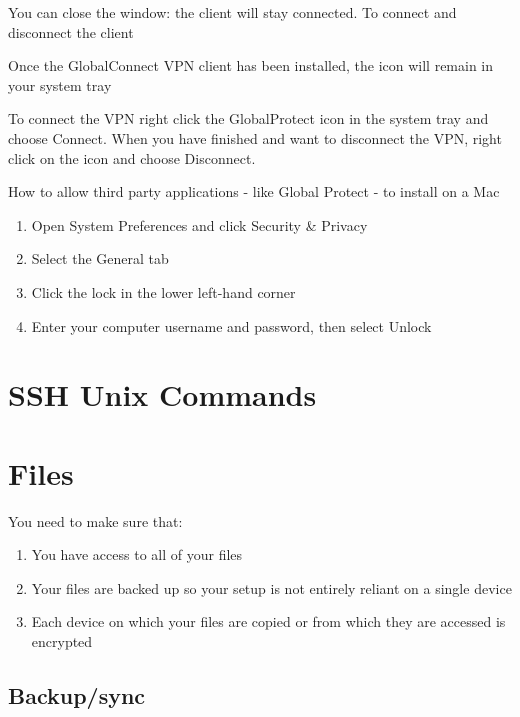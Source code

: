 \documentclass[
]{book}
\providecommand{\tightlist}{%
  \setlength{\itemsep}{0pt}\setlength{\parskip}{0pt}}
\begin{document}
You can close the window: the client will stay connected.
To connect and disconnect the client

Once the GlobalConnect VPN client has been installed, the icon will remain in your system tray

To connect the VPN right click the GlobalProtect icon in the system tray and choose Connect.
When you have finished and want to disconnect the VPN, right click on the icon and choose Disconnect.

How to allow third party applications - like Global Protect - to install on a Mac

\begin{enumerate}
\def\labelenumi{\arabic{enumi}.}
\item
  Open System Preferences and click Security \& Privacy
\item
  Select the General tab
\item
  Click the lock in the lower left-hand corner
\item
  Enter your computer username and password, then select Unlock
\end{enumerate}

\hypertarget{ssh-unix-commands}{%
\chapter{SSH Unix Commands}\label{ssh-unix-commands}}

\hypertarget{files}{%
\chapter{Files}\label{files}}

You need to make sure that:

\begin{enumerate}
\def\labelenumi{\alph{enumi})}
\tightlist
\item
  You have access to all of your files
\item
  Your files are backed up so your setup is not entirely reliant on a single device
\item
  Each device on which your files are copied or from which they are accessed
  is encrypted
\end{enumerate}

\hypertarget{backupsync}{%
\section{Backup/sync}\label{backupsync}}
\end{document}
